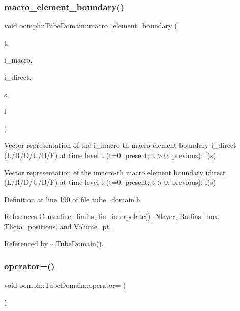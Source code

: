 \subsubsection{\texorpdfstring{macro\+\_\+element\+\_\+boundary()}{macro\_element\_boundary()}}
{\footnotesize\ttfamily void oomph\+::\+Tube\+Domain\+::macro\+\_\+element\+\_\+boundary (\begin{DoxyParamCaption}\item[{const unsigned \&}]{t,  }\item[{const unsigned \&}]{i\+\_\+macro,  }\item[{const unsigned \&}]{i\+\_\+direct,  }\item[{const Vector$<$ double $>$ \&}]{s,  }\item[{Vector$<$ double $>$ \&}]{f }\end{DoxyParamCaption})}



Vector representation of the i\+\_\+macro-\/th macro element boundary i\+\_\+direct (L/\+R/\+D/\+U/\+B/F) at time level t (t=0\+: present; t$>$0\+: previous)\+: f(s). 

Vector representation of the imacro-\/th macro element boundary idirect (L/\+R/\+D/\+U/\+B/F) at time level t (t=0\+: present; t$>$0\+: previous)\+: f(s) 

Definition at line 190 of file tube\+\_\+domain.\+h.



References Centreline\+\_\+limits, lin\+\_\+interpolate(), Nlayer, Radius\+\_\+box, Theta\+\_\+positions, and Volume\+\_\+pt.



Referenced by $\sim$\+Tube\+Domain().

\mbox{\label{classoomph_1_1TubeDomain_a3731e671028bb0ea3b01e7fe2723cbbc}} 
\subsubsection{\texorpdfstring{operator=()}{operator=()}}
{\footnotesize\ttfamily void oomph\+::\+Tube\+Domain\+::operator= (\begin{DoxyParamCaption}\item[{const \hyperlink{classoomph_1_1TubeDomain}{Tube\+Domain} \&}]{ }\end{DoxyParamCaption})\hspace{0.3cm}{\ttfamily [inline]}}



